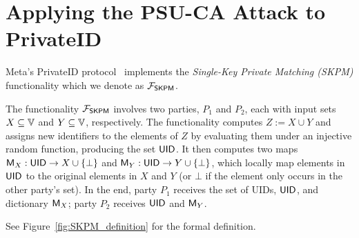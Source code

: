 \section{Applying the PSU-CA Attack to PrivateID}\label{sec:psuca-privateID-attack}

Meta's PrivateID protocol~\cite{PMC} implements the \emph{Single-Key Private Matching (SKPM)} functionality which we denote as $\mathcal{F}_{\mathsf{SKPM}}$.

The functionality $\mathcal{F}_{\mathsf{SKPM}}$ involves two parties, $P_1$ and $P_2$, each with input sets $X \subseteq \Ispace{}$ and $Y \subseteq \Ispace{}$, respectively. The functionality computes $Z := X \cup Y$ and assigns new identifiers to the elements of $Z$ by evaluating them under an injective random function, producing the set $\mathsf{UID}{}$. It then computes two maps ${\mathsf{M}_X}: \mathsf{UID}{} \to X \cup \{\bot\}$ and ${\mathsf{M}_Y}: \mathsf{UID}{} \to Y \cup \{\bot\}$, which locally map elements in $\mathsf{UID}{}$ to the original elements in $X$ and $Y$ (or $\bot$ if the element only occurs in the other party's set). In the end, party $P_1$ receives the set of UIDs, $\mathsf{UID}{}$, and dictionary ${\mathsf{M}_X}$; party $P_2$ receives $\mathsf{UID}{}$ and ${\mathsf{M}_Y}$.

See Figure~\ref{fig:SKPM_definition} for the formal definition.


